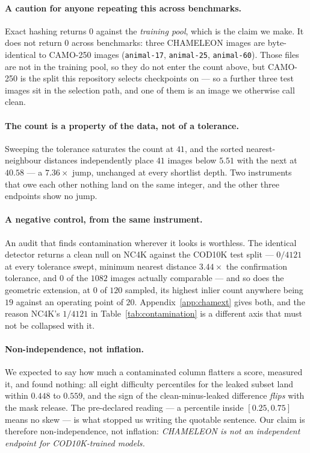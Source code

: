 \documentclass{article} %
\begin{document}
\paragraph{A caution for anyone repeating this across benchmarks.} Exact hashing returns $0$ against
the \emph{training pool}, which is the claim we make. It does not return $0$ across benchmarks:
three CHAMELEON images are byte-identical to CAMO-250 images (\texttt{animal-17}, \texttt{animal-25},
\texttt{animal-60}). Those files are not in the training pool, so they do not enter the count above,
but CAMO-250 is the split this repository selects checkpoints on --- so a further three test images
sit in the selection path, and one of them is an image we otherwise call clean.

\paragraph{The count is a property of the data, not of a tolerance.} Sweeping the tolerance saturates
the count at $41$, and the sorted nearest-neighbour distances independently place $41$ images below
$5.51$ with the next at $40.58$ --- a $7.36\times$ jump, unchanged at every shortlist depth. Two
instruments that owe each other nothing land on the same integer, and the other three endpoints show
no jump.

\paragraph{A negative control, from the same instrument.} An audit that finds contamination wherever
it looks is worthless. The identical detector returns a clean null on NC4K against the COD10K test
split --- $0/4121$ at every tolerance swept, minimum nearest distance $3.44\times$ the confirmation
tolerance, and $0$ of the $1082$ images actually comparable --- and so does the geometric extension,
at $0$ of $120$ sampled, its highest inlier count anywhere being $19$ against an operating point of
$20$. Appendix~\ref{app:chamext} gives both, and the reason NC4K's $1/4121$ in Table~\ref{tab:contamination} is a different axis that
must not be collapsed with it.

\paragraph{Non-independence, not inflation.} We expected to say how much a contaminated column
flatters a score, measured it, and found nothing: all eight difficulty percentiles for the leaked
subset land within $0.448$ to $0.559$, and the sign of the clean-minus-leaked difference
\emph{flips} with the mask release. The pre-declared reading --- a percentile inside $[0.25,0.75]$
means no skew --- is what stopped us writing the quotable sentence. Our claim is therefore
non-independence, not inflation: \emph{CHAMELEON is not an independent endpoint for COD10K-trained
models.}
\end{document}
